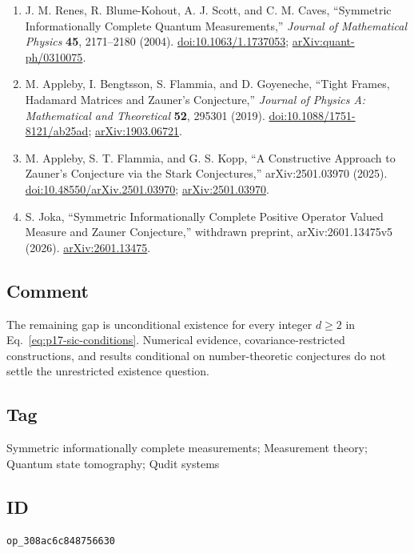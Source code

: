 \begin{enumerate}[label={},leftmargin=4.8em,labelsep=0.5em]
  \footnotesize
  \item[\textup{[RBS+04]}]\label{ref:p17-renes-et-al}
  J. M. Renes, R. Blume-Kohout, A. J. Scott, and C. M. Caves,
  ``Symmetric Informationally Complete Quantum Measurements,''
  \emph{Journal of Mathematical Physics} \textbf{45}, 2171--2180 (2004).
  \href{https://doi.org/10.1063/1.1737053}%
       {doi:10.1063/1.1737053};
  \href{https://arxiv.org/abs/quant-ph/0310075}%
       {arXiv:quant-ph/0310075}.

  \item[\textup{[ABFG19]}]\label{ref:p17-appleby-et-al}
  M. Appleby, I. Bengtsson, S. Flammia, and D. Goyeneche,
  ``Tight Frames, Hadamard Matrices and Zauner's Conjecture,''
  \emph{Journal of Physics A: Mathematical and Theoretical} \textbf{52},
  295301 (2019).
  \href{https://doi.org/10.1088/1751-8121/ab25ad}%
       {doi:10.1088/1751-8121/ab25ad};
  \href{https://arxiv.org/abs/1903.06721}{arXiv:1903.06721}.

  \item[\textup{[AFK25]}]\label{ref:p17-appleby-flammia-kopp}
  M. Appleby, S. T. Flammia, and G. S. Kopp,
  ``A Constructive Approach to Zauner's Conjecture via the Stark
  Conjectures,'' arXiv:2501.03970 (2025).
  \href{https://doi.org/10.48550/arXiv.2501.03970}%
       {doi:10.48550/arXiv.2501.03970};
  \href{https://arxiv.org/abs/2501.03970}{arXiv:2501.03970}.

  \item[\textup{[Jok26]}]\label{ref:p17-joka}
  S. Joka,
  ``Symmetric Informationally Complete Positive Operator Valued Measure and
  Zauner Conjecture,'' withdrawn preprint, arXiv:2601.13475v5 (2026).
  \href{https://arxiv.org/abs/2601.13475}{arXiv:2601.13475}.
\end{enumerate}

\subsection*{Comment}

The remaining gap is unconditional existence for every integer $d\ge2$ in
Eq.~\eqref{eq:p17-sic-conditions}.  Numerical evidence, covariance-restricted
constructions, and results conditional on number-theoretic conjectures do not
settle the unrestricted existence question.

\subsection*{Tag}

Symmetric informationally complete measurements; Measurement theory;
Quantum state tomography; Qudit systems

\subsection*{ID}

\texttt{op\_308ac6c848756630}
